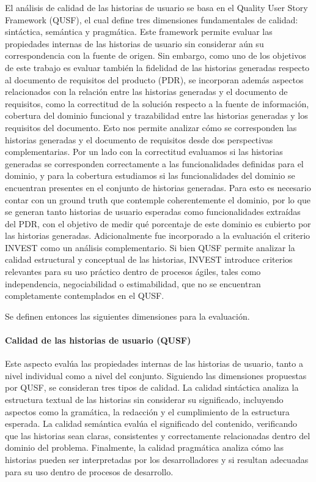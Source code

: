 El análisis de calidad de las historias de usuario se basa en el Quality User Story Framework (QUSF), el cual define tres dimensiones fundamentales de calidad: sintáctica, semántica y pragmática. Este framework permite evaluar las propiedades internas de las historias de usuario sin considerar aún su correspondencia con la fuente de origen.
Sin embargo, como uno de los objetivos de este trabajo es evaluar también la fidelidad de las historias generadas respecto al documento de requisitos del producto (PDR), se incorporan además aspectos relacionados con la relación entre las historias generadas y el documento de requisitos, como la correctitud de la solución respecto a la fuente de información, cobertura del dominio funcional y trazabilidad entre las historias generadas y los requisitos del documento. Esto nos permite analizar cómo se corresponden las historias generadas y el documento de requisitos desde dos perspectivas complementarias. Por un lado con la correctitud evaluamos si las historias generadas se corresponden correctamente a las funcionalidades definidas para el dominio, y para la cobertura estudiamos si las funcionalidades del dominio se encuentran presentes en el conjunto de historias generadas. Para esto es necesario contar con un ground truth que contemple coherentemente el dominio, por lo que se generan tanto historias de usuario esperadas como funcionalidades extraídas del PDR, con el objetivo de medir qué porcentaje de este dominio es cubierto por las historias generadas.
Adicionalmente fue incorporado a la evaluación el criterio INVEST como un análisis complementario. Si bien QUSF permite analizar la calidad estructural y conceptual de las historias, INVEST introduce criterios relevantes para su uso práctico dentro de procesos ágiles, tales como independencia, negociabilidad o estimabilidad, que no se encuentran completamente contemplados en el QUSF. 
\newline

Se definen entonces las siguientes dimensiones para la evaluación.
\paragraph{Calidad de las historias de usuario (QUSF)}
Este aspecto evalúa las propiedades internas de las historias de usuario, tanto a nivel individual como a nivel del conjunto. Siguiendo las dimensiones propuestas por QUSF, se consideran tres tipos de calidad. La calidad sintáctica analiza la estructura textual de las historias sin considerar su significado, incluyendo aspectos como la gramática, la redacción y el cumplimiento de la estructura esperada. La calidad semántica evalúa el significado del contenido, verificando que las historias sean claras, consistentes y correctamente relacionadas dentro del dominio del problema. Finalmente, la calidad pragmática analiza cómo las historias pueden ser interpretadas por los desarrolladores y si resultan adecuadas para su uso dentro de procesos de desarrollo.
